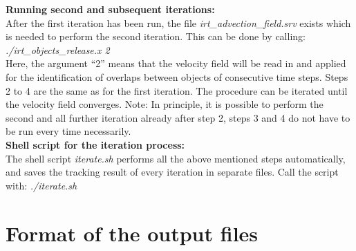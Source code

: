 \documentclass[11pt]{article}
\begin{document}
{\bf Running second and subsequent iterations:}\\
After the first iteration has been run, the file {\it irt\_advection\_field.srv} exists which is needed to perform the second iteration. This can be done by calling:
{\it ./irt\_objects\_release.x 2}\\
Here, the argument ``2'' means that the velocity field will be read in and applied for the identification of overlaps between objects of consecutive time steps. Steps 2 to 4 are the same as for the first iteration. The procedure can be iterated until the velocity field converges. Note: In principle, it is possible to perform the second and all further iteration already after step 2, steps 3 and 4 do not have to be run every time necessarily.\vspace{0.5cm}\\
{\bf Shell script for the iteration process:}\\
The shell script {\it iterate.sh} performs all the above mentioned steps automatically, and saves the tracking result of every iteration in separate files. Call the script with:
{\it ./iterate.sh}\\

\section{Format of the output files}
\end{document}
